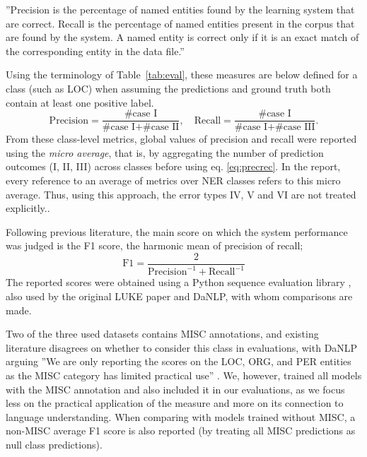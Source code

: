 \documentclass[main.tex]{subfiles}
\begin{document}
''Precision is the percentage of named entities found by the learning system that are correct.
Recall is the percentage of named entities present in the corpus that are found by the system.
A named entity is correct only if it is an exact match of the corresponding entity in the data file.''
\cite[Sec 2.4]{tjang2003conll}

Using the terminology of Table~\ref{tab:eval}, these measures are below defined for a class (such as LOC) when assuming the predictions and ground truth both contain at least one positive label.
\begin{equation}
    \label{eq:precrec}
    \text{Precision} = \frac{\text{\# case I}}{\text{\# case I} + \text{\# case II}},\quad \text{Recall} = \frac{\text{\# case I}}{\text{\# case I} + \text{\# case III}}.
\end{equation}
From these class-level metrics, global values of precision and recall were reported using the \emph{micro average}, that is, by aggregating the number of prediction outcomes (I, II, III) across classes before using eq. \eqref{eq:precrec}.
In the report, every reference to an average of metrics over NER classes refers to this micro average.
Thus, using this approach, the error types IV, V and VI are not treated explicitly.\footnotemark.

Following previous literature, the main score on which the system performance was judged is the F1 score, the harmonic mean of precision of recall;
\begin{equation}
    \label{eq:f1}
    \text{F1} = \dfrac{2}{\text{Precision}^{-1} + \text{Recall}^{-1}}
\end{equation}
The reported scores were obtained using a Python sequence evaluation library \cite{seqeval}, also used by the original LUKE paper and DaNLP, with whom comparisons are made.

Two of the three used datasets contains MISC annotations, and existing literature disagrees on whether to consider this class in evaluations, with DaNLP arguing
''We are only reporting the scores on the LOC, ORG, and PER entities as the MISC category has limited practical use'' \cite[Sec. ''Benchmarks'' in NER page]{danlp2021}.
We, however, trained all models with the MISC annotation and also included it in our evaluations, as we focus less on the practical application of the measure and more on its connection to language understanding.
When comparing with models trained without MISC, a non-MISC average F1 score is also reported (by treating all MISC predictions as null class predictions).
\end{document}
